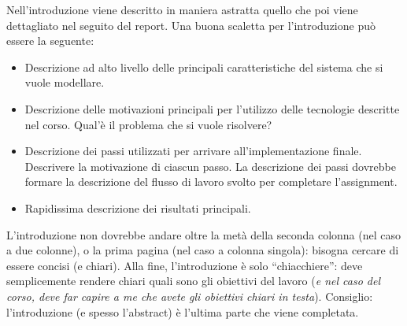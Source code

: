 \documentclass[]{IEEEtran}
\begin{document}
Nell'introduzione viene descritto in maniera astratta quello che poi viene dettagliato nel seguito del report. Una buona 
scaletta per l'introduzione pu\`o essere la seguente:
\begin{itemize}
\item Descrizione ad alto livello delle principali caratteristiche del sistema che si vuole modellare.
\item Descrizione delle motivazioni principali per l'utilizzo delle tecnologie descritte nel corso. Qual'\`e il problema 
che si vuole risolvere?
\item Descrizione dei passi utilizzati per arrivare all'implementazione finale. Descrivere la motivazione di ciascun 
passo. La descrizione dei passi dovrebbe 
formare la descrizione del flusso di lavoro svolto per completare l'assignment.
\item Rapidissima descrizione dei risultati principali.
\end{itemize}

L'introduzione non dovrebbe andare oltre la met\`a della seconda colonna (nel caso a due colonne), o la prima pagina 
(nel caso a colonna singola): bisogna cercare di essere concisi (e chiari). Alla fine, l'introduzione \`e solo 
``chiacchiere'': deve semplicemente rendere chiari quali sono gli obiettivi del lavoro (\emph{e nel caso del corso, deve 
far capire a me che avete gli obiettivi chiari in testa}). Consiglio: l'introduzione (e spesso l'abstract) \`e l'ultima 
parte che viene completata.
\end{document}
